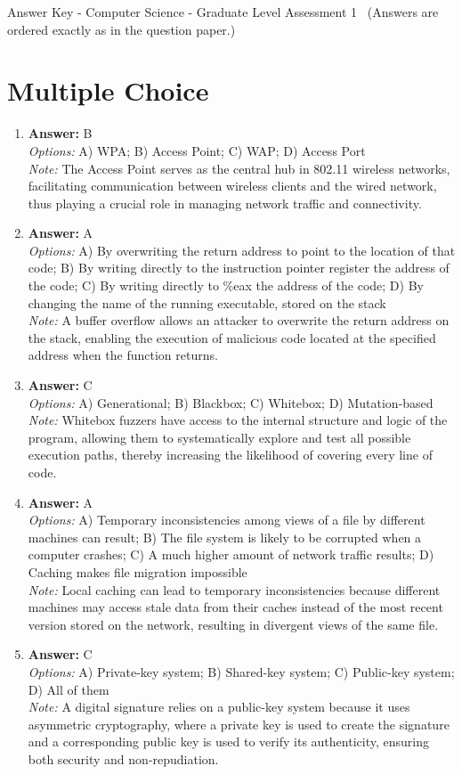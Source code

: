 \documentclass[12pt]{article}
\begin{document}
\begin{center}
Answer Key - Computer Science - Graduate Level Assessment 1 \
\small (Answers are ordered exactly as in the question paper.)
\end{center}

\section*{Multiple Choice}
\begin{enumerate}[label=\arabic*.]
\item \textbf{Answer:} B
\\ \textit{Options:} A) WPA; B) Access Point; C) WAP; D) Access Port
\\ \textit{Note:} The Access Point serves as the central hub in 802.11 wireless networks, facilitating communication between wireless clients and the wired network, thus playing a crucial role in managing network traffic and connectivity.
\item \textbf{Answer:} A
\\ \textit{Options:} A) By overwriting the return address to point to the location of that code; B) By writing directly to the instruction pointer register the address of the code; C) By writing directly to \%eax the address of the code; D) By changing the name of the running executable, stored on the stack
\\ \textit{Note:} A buffer overflow allows an attacker to overwrite the return address on the stack, enabling the execution of malicious code located at the specified address when the function returns.
\item \textbf{Answer:} C
\\ \textit{Options:} A) Generational; B) Blackbox; C) Whitebox; D) Mutation-based
\\ \textit{Note:} Whitebox fuzzers have access to the internal structure and logic of the program, allowing them to systematically explore and test all possible execution paths, thereby increasing the likelihood of covering every line of code.
\item \textbf{Answer:} A
\\ \textit{Options:} A) Temporary inconsistencies among views of a file by different machines can result; B) The file system is likely to be corrupted when a computer crashes; C) A much higher amount of network traffic results; D) Caching makes file migration impossible
\\ \textit{Note:} Local caching can lead to temporary inconsistencies because different machines may access stale data from their caches instead of the most recent version stored on the network, resulting in divergent views of the same file.
\item \textbf{Answer:} C
\\ \textit{Options:} A) Private-key system; B) Shared-key system; C) Public-key system; D) All of them
\\ \textit{Note:} A digital signature relies on a public-key system because it uses asymmetric cryptography, where a private key is used to create the signature and a corresponding public key is used to verify its authenticity, ensuring both security and non-repudiation.
\end{enumerate}
\end{document}
